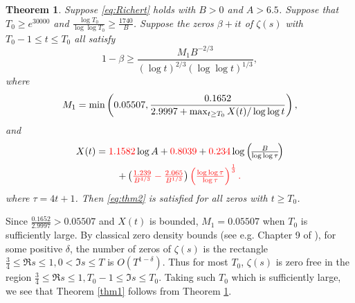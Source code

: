 \documentclass[10pt]{amsart}
\theoremstyle{remark}
\theoremstyle{plain}
\newtheorem{theorem}{Theorem}
\numberwithin{equation}{section}
\theoremstyle{definition}
\def\({\left(}
\def\){\right)}
\newcommand{\rev}[1]{{\color{red}#1}}
\begin{document}
\begin{theorem}\label{thm2}
\rev{Suppose \eqref{eq:Richert} holds with $B>0$ and $A>6.5$.}  Suppose that
$T_0 \ge e^{30000}$
and $\frac{\log T_0}{\log\log T_0} \ge \frac{1740}{B}$.
Suppose the zeros $\beta+it$ of $\zeta(s)$ with $T_0-1\le t\le T_0$
all satisfy
\begin{equation}
1-\beta \ge  \frac{M_1 B^{-2/3}}{(\log t)^{2/3}
 (\log\log t)^{1/3}}, \label{eq:thm2}
\end{equation}
where 
$$
M_1 = \min \( 0.05507, \frac{0.1652}{2.9997+
\operatornamewithlimits{max}_{t\ge T_0}
X(t)/\log\log t} \),
$$
and
\begin{multline*}
X(t) = \rev{1.1582}\log A+\rev{0.8039}+\rev{0.234}\log \(\!\tfrac{B}{\log\log \tau}\!\) \\
+  \( \rev{\tfrac{1.239}{B^{4/3}}-\tfrac{2.065}{B^{1/3}}} \)
 \rev{\( \tfrac{\log\log \tau }{\log  \tau} \)^{\frac13}.}
\end{multline*}
\rev{where $\tau=4t+1$.}
Then \eqref{eq:thm2} is satisfied for all zeros with $t \ge T_0$.
\end{theorem}

Since $\frac{0.1652}{2.9997} > 0.05507$ \rev{ and $X(t)$ is bounded},
 $M_1 = 0.05507$ when $T_0$ is sufficiently large.
By classical zero density bounds (see e.g. Chapter 9 of \cite{T}), for some
positive $\delta$, the number of zeros of $\zeta(s)$ is the rectangle
$\frac34 \le \Re s \le 1, 0 < \Im s \le T$ is $O(T^{1-\delta})$.  Thus
for most $T_0$, $\zeta(s)$ is zero free in the region $\frac34 \le \Re s
\le 1, T_0-1\le \Im s \le T_0$.  Taking such $T_0$ which is sufficiently
large, we see that Theorem \ref{thm1} follows from Theorem \ref{thm2}.
\end{document}

